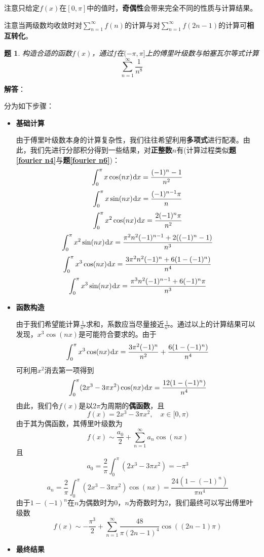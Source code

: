 \documentclass[a4paper,UTF8,fontset=windows,AutoFakeBold]{ctexart}
\newcommand*{\dr}{\hspace{0.07em}\mathrm{d}}
\newcommand*{\suminf}[1][n=1]{\sum_{#1}^\infty}
\newcommand*{\note}{\noindent *}
\theoremstyle{ex}
\newtheorem{exercise}{题}
\newcommand{\exref}[1]{\textbf{题\;\ref{#1}\;}}
\newcommand{\sol}[1]{{\vspace{5pt}\kaishu\noindent\textbf{解答}：\vspace{-3pt}
\begin{compactitem}
    \item[] #1
\end{compactitem}
}}
\begin{document}
\note 注意只给定$f(x)$在$[0,\pi]$中的值时，\textbf{奇偶性}会带来完全不同的性质与计算结果。

\note 注意当两级数均收敛时对$\suminf f(n)$的计算与对$\suminf f(2n-1)$的计算可\textbf{相互转化}。

\begin{framed}
\begin{exercise}
    构造合适的函数$f(x)$，通过$f$在$(-\pi,\pi]$上的傅里叶级数与帕塞瓦尔等式计算
    $$\suminf\frac{1}{n^8}$$
\end{exercise}
\sol{
    分为如下步骤：
    \begin{itemize}
        \item \textbf{基础计算}
        
        由于傅里叶级数本身的计算复杂性，我们往往希望利用\textbf{多项式}进行配凑。由此，我们先进行分部积分得到一些结果，对\textbf{正整数}$n$有(计算过程类似\exref{fourier n4}与\exref{fourier n6})：
        $$\int_0^\pi x\cos(nx)\dr x=\frac{(-1)^n-1}{n^2}$$
        $$\int_0^\pi x\sin(nx)\dr x=\frac{(-1)^{n-1}\pi}{n}$$
        $$\int_0^\pi x^2\cos(nx)\dr x=\frac{2(-1)^n\pi}{n^2}$$
        $$\int_0^\pi x^2\sin(nx)\dr x=\frac{\pi^2n^2(-1)^{n-1}+2((-1)^n-1)}{n^3}$$
        $$\int_0^\pi x^3\cos(nx)\dr x=\frac{3\pi^2n^2(-1)^n+6(1-(-1)^n)}{n^4}$$
        $$\int_0^\pi x^3\sin(nx)\dr x=\frac{\pi^3n^2(-1)^{n-1}+6(-1)^n\pi}{n^3}$$

        \item \textbf{函数构造}
        
        由于我们希望能计算$\frac{1}{n^8}$求和，系数应当尽量接近$\frac{1}{n^4}$。通过以上的计算结果可以发现，$x^3\cos(nx)$是可能符合要求的。由于
        $$\int_0^\pi x^3\cos(nx)\dr x=\frac{3\pi^2(-1)^n}{n^2}+\frac{6(1-(-1)^n)}{n^4}$$
        可利用$x^2$消去第一项得到
        $$\int_0^\pi(2x^3-3\pi x^2)\cos(nx)\dr x=\frac{12(1-(-1)^n)}{n^4}$$
        由此，我们令$f(x)$是以$2\pi$为周期的\textbf{偶函数}，且
        $$f(x)=2x^3-3\pi x^2,\quad x\in[0,\pi)$$
        由于其为偶函数，其傅里叶级数为
        $$f(x)\sim\frac{a_0}{2}+\suminf a_n\cos(nx)$$
        且
        $$a_0=\frac{2}{\pi}\int_0^\pi(2x^3-3\pi x^2)=-\pi^3$$
        $$a_n=\frac{2}{\pi}\int_0^\pi(2x^3-3\pi x^2)\cos(nx)=\frac{24(1-(-1)^n)}{\pi n^4}$$
        由于$1-(-1)^n$在$n$为偶数时为0，$n$为奇数时为2，我们最终可以写出傅里叶级数
        $$f(x)\sim-\frac{\pi^3}{2}+\suminf\frac{48}{\pi(2n-1)^4}\cos((2n-1)\pi)$$
        
        \item \textbf{最终结果}
        

\end{itemize}}
\end{framed}
\end{document}
